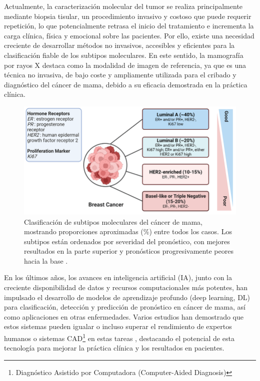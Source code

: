 \documentclass[a4paper,10pt]{book}
\begin{document}
Actualmente, la caracterización molecular del tumor se realiza principalmente mediante biopsia tisular, un procedimiento invasivo y costoso que puede requerir repetición, lo que potencialmente retrasa el inicio del tratamiento e incrementa la carga clínica, física y emocional sobre las pacientes. Por ello, existe una necesidad creciente de desarrollar métodos no invasivos, accesibles y eficientes para la clasificación fiable de los subtipos moleculares. En este sentido, la mamografía por rayos X destaca como la modalidad de imagen de referencia, ya que es una técnica no invasiva, de bajo coste y ampliamente utilizada para el cribado y diagnóstico del cáncer de mama, debido a su eficacia demostrada en la práctica clínica.

\begin{figure}
\center
\includegraphics[width=0.8\linewidth]{reports/assets/subtypes.png} 
\caption[Clasificación de subtipos moleculares del cáncer de mama.]{Clasificación de subtipos moleculares del cáncer de mama, mostrando proporciones aproximadas (\%) entre todos los casos. Los subtipos están ordenados por severidad del pronóstico, con mejores resultados en la parte superior y pronósticos progresivamente peores hacia la base \cite{harnessing_2024}.} \label{fig:subtypes} 
\end{figure}

En los últimos años, los avances en inteligencia artificial (IA), junto con la creciente disponibilidad de datos y recursos computacionales más potentes, han impulsado el desarrollo de modelos de aprendizaje profundo (deep learning, DL) para clasificación, detección y predicción de pronóstico en cáncer de mama, así como aplicaciones en otras enfermedades. Varios estudios han demostrado que estos sistemas pueden igualar o incluso superar el rendimiento de expertos humanos o sistemas CAD\footnote{Diagnóstico Asistido por Computadora (Computer-Aided Diagnosis)} en estas tareas \cite{mckinney_international_2020,pattanaik_breast_2022,meenalochini_deep_2024,hussain_performance_2025}, destacando el potencial de esta tecnología para mejorar la práctica clínica y los resultados en pacientes.
\end{document}
